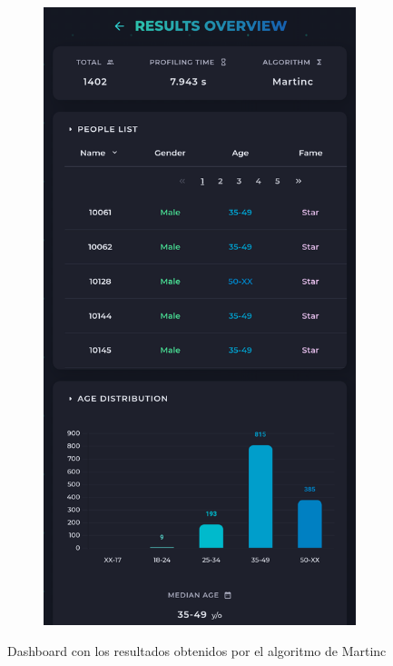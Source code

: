 \begin{figure}[H]
\begin{subfigure}[c]{0.21\textwidth}
			\includegraphics[width=\textwidth]{imagenes/dashboard-martinc-500_movil.png}
			\label{fig:casouso_dashboard_martinc_movil}
	\end{subfigure}
	\vspace{-1\baselineskip}
	\caption{Dashboard con los resultados obtenidos por el algoritmo de Martinc \cite{martinc2019hot}}
	\label{fig:casouso_dashboard_martinc}
\end{figure}

